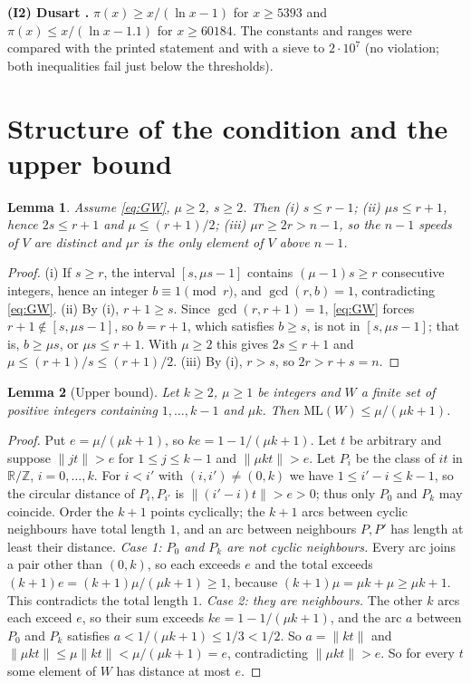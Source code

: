 \documentclass[11pt]{article}
\newtheorem{lemma}{Lemma}
\theoremstyle{remark}
\newcommand{\norm}[1]{\lVert #1\rVert}
\newcommand{\ML}{\mathrm{ML}}
\newcommand{\Z}{\mathbb{Z}}
\begin{document}
\textbf{(I2) Dusart \cite[Theorem~6.9, display (6.6)]{Dusart10}.} $\pi(x)\ge x/(\ln x-1)$ for $x\ge5393$ and $\pi(x)\le x/(\ln x-1.1)$ for $x\ge60184$. The constants and ranges were compared with the printed statement and with a sieve to $2\cdot10^7$ (no violation; both inequalities fail just below the thresholds).

\section{Structure of the condition and the upper bound}\label{sec:basic}

\begin{lemma}\label{lem:struct}
Assume \eqref{eq:GW}, $\mu\ge2$, $s\ge2$. Then (i) $s\le r-1$; (ii) $\mu s\le r+1$, hence $2s\le r+1$ and $\mu\le(r+1)/2$; (iii) $\mu r\ge2r>n-1$, so the $n-1$ speeds of $V$ are distinct and $\mu r$ is the only element of $V$ above $n-1$.
\end{lemma}
\begin{proof}
(i) If $s\ge r$, the interval $[s,\mu s-1]$ contains $(\mu-1)s\ge r$ consecutive integers, hence an integer $b\equiv1\pmod r$, and $\gcd(r,b)=1$, contradicting \eqref{eq:GW}. (ii) By (i), $r+1\ge s$. Since $\gcd(r,r+1)=1$, \eqref{eq:GW} forces $r+1\notin[s,\mu s-1]$, so $b=r+1$, which satisfies $b\ge s$, is not in $[s,\mu s-1]$; that is, $b\ge\mu s$, or $\mu s\le r+1$. With $\mu\ge2$ this gives $2s\le r+1$ and $\mu\le(r+1)/s\le(r+1)/2$. (iii) By (i), $r>s$, so $2r>r+s=n$.
\end{proof}

\begin{lemma}[Upper bound]\label{lem:ub}
Let $k\ge2$, $\mu\ge1$ be integers and $W$ a finite set of positive integers containing $1,\dots,k-1$ and $\mu k$. Then $\ML(W)\le\mu/(\mu k+1)$.
\end{lemma}
\begin{proof}
Put $e=\mu/(\mu k+1)$, so $ke=1-1/(\mu k+1)$. Let $t$ be arbitrary and suppose $\norm{jt}>e$ for $1\le j\le k-1$ and $\norm{\mu kt}>e$. Let $P_i$ be the class of $it$ in $\mathbb R/\Z$, $i=0,\dots,k$. For $i<i'$ with $(i,i')\ne(0,k)$ we have $1\le i'-i\le k-1$, so the circular distance of $P_i,P_{i'}$ is $\norm{(i'-i)t}>e>0$; thus only $P_0$ and $P_k$ may coincide. Order the $k+1$ points cyclically; the $k+1$ arcs between cyclic neighbours have total length $1$, and an arc between neighbours $P,P'$ has length at least their distance.
\emph{Case 1: $P_0$ and $P_k$ are not cyclic neighbours.} Every arc joins a pair other than $(0,k)$, so each exceeds $e$ and the total exceeds $(k+1)e=(k+1)\mu/(\mu k+1)\ge1$, because $(k+1)\mu=\mu k+\mu\ge\mu k+1$. This contradicts the total length $1$.
\emph{Case 2: they are neighbours.} The other $k$ arcs each exceed $e$, so their sum exceeds $ke=1-1/(\mu k+1)$, and the arc $a$ between $P_0$ and $P_k$ satisfies $a<1/(\mu k+1)\le1/3<1/2$. So $a=\norm{kt}$ and $\norm{\mu kt}\le\mu\norm{kt}<\mu/(\mu k+1)=e$, contradicting $\norm{\mu kt}>e$.
So for every $t$ some element of $W$ has distance at most $e$.
\end{proof}
\end{document}
